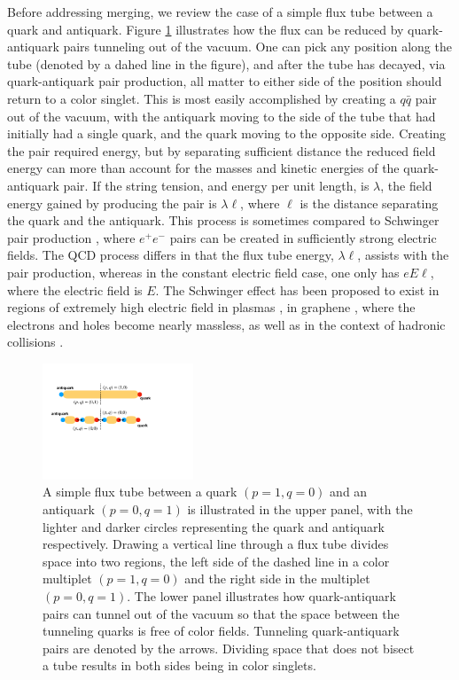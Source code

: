 \documentclass[aps, prc, 12pt, nofootinbib, showpacs, superscriptaddress, tightenlines, groupedaddress]{revtex4-2}
\begin{document}
Before addressing merging, we review the case of a simple flux tube between a quark and antiquark. Figure \ref{fig:simpletube} illustrates how the flux can be reduced by quark-antiquark pairs tunneling out of the vacuum. One can pick any position along the tube (denoted by a dahed line in the figure), and after the tube has decayed, via quark-antiquark pair production, all matter to either side of the position should return to a color singlet. This is most easily accomplished by creating a $q\bar{q}$ pair out of the vacuum, with the antiquark moving to the side of the tube that had initially had a single quark, and the quark moving to the opposite side. Creating the pair required energy, but by separating sufficient distance the reduced field energy can more than account for the masses and kinetic energies of the quark-antiquark pair. If the string tension, and energy per unit length, is $\lambda$, the field energy gained by producing the pair is $\lambda \ell$, where $\ell$ is the distance separating the quark and the antiquark. This process is sometimes compared to Schwinger pair production \cite{Schwinger}, where $e^+e^-$ pairs can be created in sufficiently strong electric fields. The QCD process differs in that the flux tube energy, $\lambda\ell$, assists with the pair production, whereas in the constant electric field case, one only has $eE\ell$, where the electric field is $E$. The Schwinger effect has been proposed to exist in regions of extremely high electric field in plasmas \cite{Schwinger_plasma}, in graphene \cite{Schwinger_graphene}, where the electrons and holes become nearly massless, as well as in the context of hadronic collisions \cite{Wong:1994ei,Suganuma:1991ha}.
\begin{figure}
\centerline{\includegraphics[width=0.4\textwidth]{figs/simpletube.pdf}}
\caption{\label{fig:simpletube}
A simple flux tube between a quark $(p=1,q=0)$ and an antiquark $(p=0,q=1)$ is illustrated in the upper panel, with the lighter and darker circles representing the quark and antiquark respectively. Drawing a vertical line through a flux tube divides space into two regions, the left side of the dashed line in a color multiplet $(p=1,q=0)$ and the right side in the multiplet $(p=0,q=1)$. The lower panel illustrates how quark-antiquark pairs can tunnel out of the vacuum so that the space between the tunneling quarks is free of color fields. Tunneling quark-antiquark pairs are denoted by the arrows.  Dividing space that does not bisect a tube results in both sides being in color singlets.
}
\end{figure}
\end{document}
